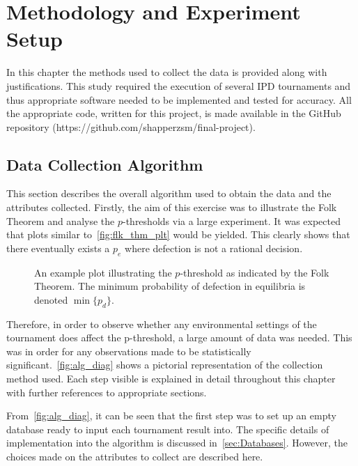\chapter{Methodology and Experiment Setup}\label{ch:Methods}
In this chapter the methods used to collect the data is provided along with
justifications. This study required the execution of several IPD tournaments and
thus appropriate software needed to be implemented and tested for accuracy. All
the appropriate code, written for this project, is made available in the GitHub
repository (https://github.com/shapperzsm/final-project).

\section{Data Collection Algorithm}\label{sec:Data_Collection_Algorithm}
This section describes the overall algorithm used to obtain the data and the
attributes collected. Firstly, the aim of this exercise was
to illustrate the Folk Theorem and analyse the \(p\)-thresholds via a large
experiment. It was expected that plots similar to~\autoref{fig:flk_thm_plt}
would be yielded. This clearly shows that there eventually exists a
\(p_{e}\) where defection is not a rational decision.

\begin{figure}
    \centering
    
    \caption{An example plot illustrating the \(p\)-threshold as indicated by the Folk Theorem. The minimum probability of defection in equilibria is denoted \(\min \{p_{d}\} \).}\label{fig:flk_thm_plt}
\end{figure}

Therefore, in order to observe whether any environmental settings of the
tournament does affect the p-threshold, a large amount of data was needed. This
was in order for any observations made to be statistically significant.~\autoref{fig:alg_diag} shows
a pictorial representation of the collection method used. Each step visible is
explained in detail throughout this chapter with further references to
appropriate sections.

%    

From~\autoref{fig:alg_diag}, it can be seen that the first step was to set up an
empty database ready to input each tournament result into. 
The specific details of implementation into the algorithm is discussed in~\autoref{sec:Databases}. However, the choices made on the attributes to
collect are described here. 

